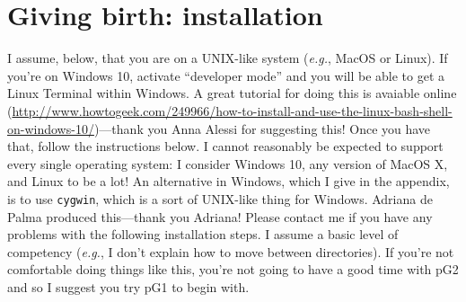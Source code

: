 \documentclass[12pt]{article}
\begin{document}
\section*{Giving birth: installation}
I assume, below, that you are on a UNIX-like system (\emph{e.g.},
MacOS or Linux). If you're on Windows 10, activate ``developer mode''
and you will be able to get a Linux Terminal within Windows. A great
tutorial for doing this is avaiable online
\\(\url{http://www.howtogeek.com/249966/how-to-install-and-use-the-linux-bash-shell-on-windows-10/})---thank
you Anna Alessi for suggesting this! Once you have that, follow the
instructions below. I cannot reasonably be expected to support every
single operating system: I consider Windows 10, any version of MacOS
X, and Linux to be a lot!  An alternative in Windows, which I give in
the appendix, is to use \texttt{cygwin}, which is a sort of UNIX-like
thing for Windows. Adriana de Palma produced this---thank you Adriana!
Please contact me if you have any problems with the following
installation steps. I assume a basic level of competency (\emph{e.g.},
I don't explain how to move between directories). If you're not
comfortable doing things like this, you're not going to have a good
time with pG2 and so I suggest you try pG1 to begin with.
\end{document}
